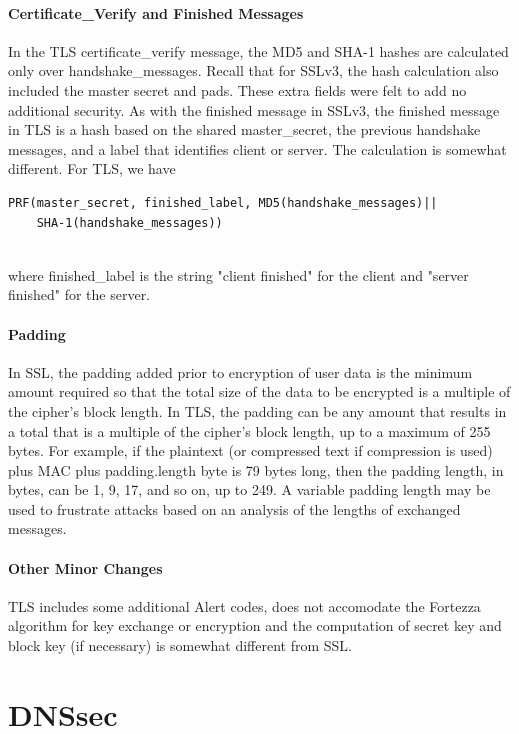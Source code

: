 \documentclass[12pt]{article}
\begin{document}
\paragraph*{Certificate\_Verify and Finished Messages}
In the TLS certificate\_verify message, the MD5 and SHA-1 hashes are calculated only over handshake\_messages. Recall that for SSLv3, the hash calculation also included the master secret and pads. These extra fields were felt to add no additional security.
As with the finished message in SSLv3, the finished message in TLS is a hash based on the shared master\_secret, the previous handshake messages, and a label that identifies client or server. The calculation is somewhat different. For TLS, we have
\begin{verbatim}
PRF(master_secret, finished_label, MD5(handshake_messages)||
    SHA-1(handshake_messages))
￼
\end{verbatim}
where finished\_label is the string "client finished" for the client and "server finished" for the server.
\paragraph*{Padding}
In SSL, the padding added prior to encryption of user data is the minimum amount required so that the total size of the data to be encrypted is a multiple of the cipher's block length. In TLS, the padding can be any amount that results in a total that is a multiple of the cipher's block length, up to a maximum of 255 bytes. For example, if the plaintext (or compressed text if compression is used) plus MAC plus padding.length byte is 79 bytes long, then the padding length, in bytes, can be 1, 9, 17, and so on, up to 249. A variable padding length may be used to frustrate attacks based on an analysis of the lengths of exchanged messages.
\paragraph*{Other Minor Changes}
TLS includes some additional Alert codes, does not accomodate the Fortezza algorithm for key exchange or encryption and the computation of secret key and block key (if necessary) is somewhat different from SSL.

\section{DNSsec}
\end{document}
